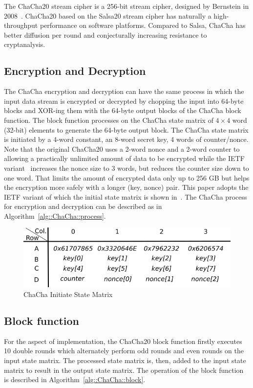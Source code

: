 The ChaCha20 stream cipher is a 256-bit stream cipher, designed by Bernstein in 2008~\cite{Ber:08}.
ChaCha20 based on the Salsa20 stream cipher has naturally a high-throughput performance on software platforms.
Compared to Salsa, ChaCha has better diffusion per round and conjecturally increasing resistance to cryptanalysis. 

\subsection{Encryption and Decryption}
The ChaCha encryption and decryption can have the same process in which the input data stream is encrypted or decrypted by chopping the input into 64-byte blocks and XOR-ing them with the 64-byte output blocks of the ChaCha block function. The block function processes on the ChaCha state matrix of $4\times4$ word (32-bit) elements to generate the 64-byte output block.
The ChaCha state matrix is initiated by a 4-word constant, an 8-word secret key, 4 words of counter/nonce. 
Note that the original ChaCha20 uses a 2-word nonce and a 2-word counter to allowing a practically unlimited amount of data to be encrypted while the IETF variant~\cite{RFC:18} increases the nonce size to 3 words, but reduces the counter size down to one word.
That limits the amount of encrypted data only up to 256 GB but helps the encryption more safely with a longer (key, nonce) pair. 
This paper adopts the IETF variant of which the initial state matrix is shown in~.
The ChaCha process for encryption and decryption can be described as in Algorithm~\ref{alg::ChaCha::process}.

\begin{figure}
	\centering
	\includegraphics[scale=0.5]{figures/ChaChaState.png}
	\caption{ChaCha Initiate State Matrix}
	\label{fig:bg:ChaChaMatix}
\end{figure}

\subsection{Block function}
For the aspect of implementation, the ChaCha20 block function firstly executes 10 double rounds which alternately perform odd rounds and even rounds on the input state matrix. The processed state matrix is, then, added to the input state matrix to result in the output state matrix. The operation of the block function is described in Algorithm~\ref{alg::ChaCha::block}.

